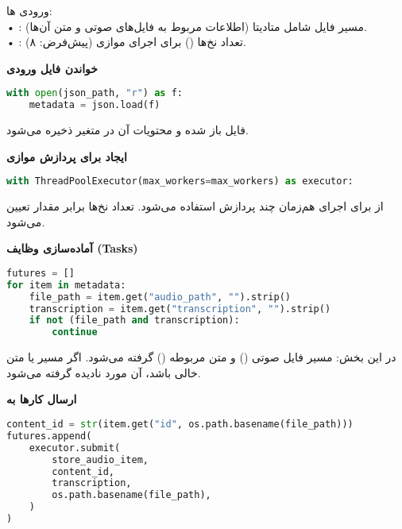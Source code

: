 \documentclass{article}
\begin{document}
ورودی ها: \\
• : مسیر فایل  شامل متادیتا (اطلاعات مربوط به فایل‌های صوتی و متن آن‌ها).   \\
• : تعداد نخ‌ها () برای اجرای موازی (پیش‌فرض: ۸).  

\textbf{خواندن فایل  ورودی}

\begin{latin}
\begin{lstlisting}[language=Python]
with open(json_path, "r") as f:
    metadata = json.load(f)
\end{lstlisting}
\end{latin}

فایل  باز شده و محتویات آن در متغیر  ذخیره می‌شود.  

\textbf{ایجاد  برای پردازش موازی}

\begin{latin}
\begin{lstlisting}[language=Python]
with ThreadPoolExecutor(max_workers=max_workers) as executor:
\end{lstlisting}
\end{latin}

از  برای اجرای هم‌زمان چند پردازش استفاده می‌شود.   تعداد نخ‌ها برابر مقدار  تعیین می‌شود.  

\textbf{آماده‌سازی وظایف (Tasks)}

\begin{latin}
\begin{lstlisting}[language=Python]
futures = []
for item in metadata:
    file_path = item.get("audio_path", "").strip()
    transcription = item.get("transcription", "").strip()
    if not (file_path and transcription):
        continue
\end{lstlisting}
\end{latin}

در این بخش:  مسیر فایل صوتی () و متن مربوطه () گرفته می‌شود.   اگر مسیر یا متن خالی باشد، آن مورد نادیده گرفته می‌شود.  

\textbf{ارسال کارها به }

\begin{latin}
\begin{lstlisting}[language=Python]
content_id = str(item.get("id", os.path.basename(file_path)))
futures.append(
    executor.submit(
        store_audio_item,
        content_id,
        transcription,
        os.path.basename(file_path),
    )
)
\end{lstlisting}
\end{latin}
\end{document}
